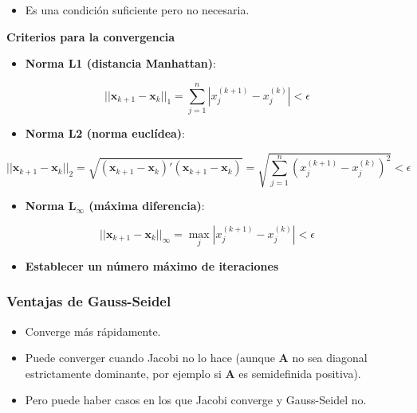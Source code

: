 \documentclass[]{book}
\providecommand{\tightlist}{%
  \setlength{\itemsep}{0pt}\setlength{\parskip}{0pt}}
\begin{document}
\begin{itemize}
\tightlist
\item
  Es una condición suficiente pero no necesaria.
\end{itemize}

\textbf{Criterios para la convergencia}

\begin{itemize}
\tightlist
\item
  \textbf{Norma L1 (distancia Manhattan)}:
\end{itemize}

\[
||\mathbf{x}_{k+1}-\mathbf{x}_{k}||_1 =\sum_{j=1}^n |x_j^{(k+1)} - x_j^{(k)}| < \epsilon
\]

\begin{itemize}
\tightlist
\item
  \textbf{Norma L2 (norma euclídea)}:
\end{itemize}

\[||\mathbf{x}_{k+1}-\mathbf{x}_{k}||_2 = \sqrt{(\mathbf{x}_{k+1}-\mathbf{x}_{k})'(\mathbf{x}_{k+1}-\mathbf{x}_{k})} = \sqrt{\sum_{j=1}^n (x_j^{(k+1)} - x_j^{(k)})^2} < \epsilon\]

\begin{itemize}
\tightlist
\item
  \textbf{Norma L\(_\infty\) (máxima diferencia)}:
\end{itemize}

\[
||\mathbf{x}_{k+1}-\mathbf{x}_{k}||_\infty = \max_{j} |x_j^{(k+1)} - x_j^{(k)}| < \epsilon
\]

\begin{itemize}
\tightlist
\item
  \textbf{Establecer un número máximo de iteraciones}
\end{itemize}

\hypertarget{ventajas-de-gauss-seidel}{%
\subsubsection{Ventajas de Gauss-Seidel}\label{ventajas-de-gauss-seidel}}

\begin{itemize}
\tightlist
\item
  Converge más rápidamente.
\item
  Puede converger cuando Jacobi no lo hace (aunque \(\mathbf{A}\) no sea diagonal estrictamente dominante, por ejemplo si \(\mathbf{A}\) es semidefinida positiva).
\item
  Pero puede haber casos en los que Jacobi converge y Gauss-Seidel no.
\end{itemize}
\end{document}
